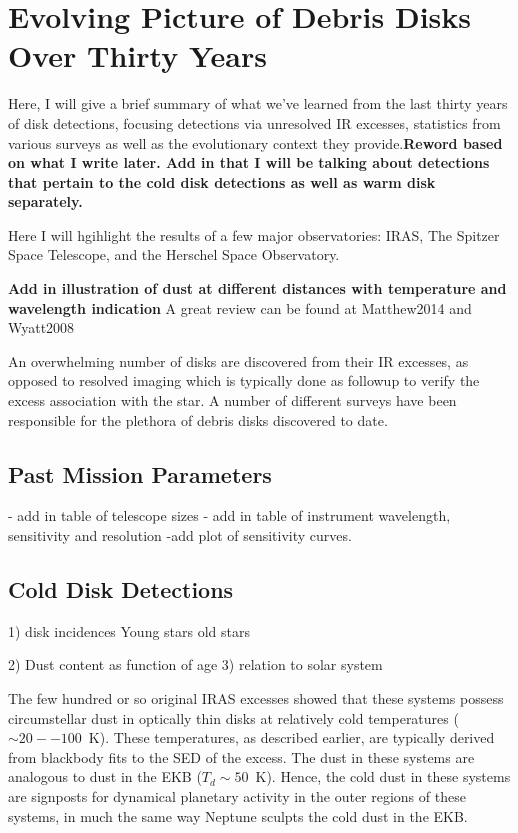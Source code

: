 \section{Evolving Picture of Debris Disks Over Thirty Years}\label{sec:thirty_years}
       
     Here, I will give a brief summary of what we've learned from the last thirty years of disk detections, focusing detections via unresolved IR excesses, statistics from various surveys as well as the evolutionary context they provide.\textbf{Reword based on what I write later. Add in that I will be talking about detections that pertain to the cold disk detections as well as warm disk separately.} 
    
    Here I will hgihlight the results of a few major observatories: IRAS, The Spitzer Space Telescope, and the Herschel Space Observatory.
    
    
    \textbf{Add in illustration of dust at different distances with temperature and wavelength indication}
   A great review can be found at Matthew2014 and Wyatt2008
   
   An overwhelming number of disks are discovered from their IR excesses, as opposed to resolved imaging which is typically done as followup to verify the excess association with the star. A number of different surveys have been responsible for the plethora of debris disks discovered to date. 
   
   \subsection{Past Mission Parameters}
   
   - add in table of telescope sizes
   - add in table of instrument wavelength, sensitivity and resolution
   -add plot of sensitivity curves.
   
   
   
   \subsection{Cold Disk Detections}
   
   1) disk incidences
     Young stars
     old stars
    
   2) Dust content as function of age
   3) relation to solar system
   
   
   The few hundred or so original IRAS excesses showed that these systems possess circumstellar dust in optically thin disks at relatively cold temperatures ($\sim20--100$~K). These temperatures, as described earlier, are typically derived from blackbody fits to the SED of the excess. The dust in these systems are analogous to dust in the EKB ($T_d\sim50$~K). Hence, the cold dust in these systems are signposts for dynamical planetary activity in the outer regions of these systems, in much the same way Neptune sculpts the cold dust in the EKB.
   
